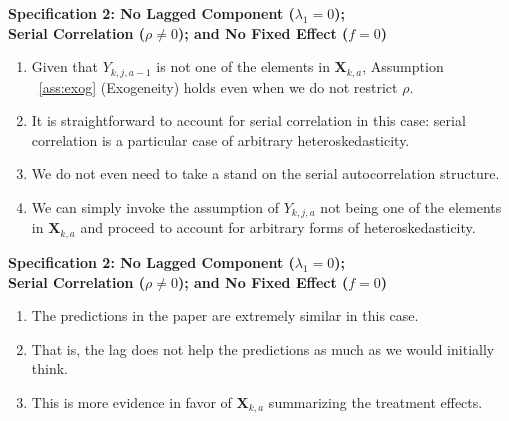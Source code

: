 \documentclass[static]{JJH-Beamer}
\begin{document}
\begin{frame}
 \addtocounter{framenumber}{-1}

\textbf{Specification 2: No Lagged Component ($\lambda_{1} = 0$);\\ Serial Correlation ($\rho \neq 0$); and No Fixed Effect ($f = 0$)}

\begin{enumerate}
\item Given that $Y_{k,j,a-1}$ is not one of the elements in $\bm{X}_{k,a}$, Assumption ~\ref{ass:exog} (Exogeneity) holds even when we do not restrict $\rho$.
\item It is straightforward to account for serial correlation in this case: serial correlation is a particular case of arbitrary heteroskedasticity.
\item We do not even need to take a stand on the serial autocorrelation structure.
\item We can simply invoke the assumption of $Y_{k,j,a}$ not being one of the elements in $\bm{X}_{k,a}$ and proceed to account for arbitrary forms of heteroskedasticity.
\end{enumerate}

\end{frame}

\begin{frame}
 \addtocounter{framenumber}{-1}

\textbf{Specification 2: No Lagged Component ($\lambda_{1} = 0$);\\ Serial Correlation ($\rho \neq 0$); and No Fixed Effect ($f = 0$)}

\begin{enumerate}\addtocounter{enumi}{4}
\item The predictions in the paper are extremely similar in this case.
\item That is, the lag does not help the predictions as much as we would initially think.
\item This is more evidence in favor of $\bm{X}_{k,a}$ summarizing the treatment effects.
\end{enumerate}

\end{frame}
\end{document}
